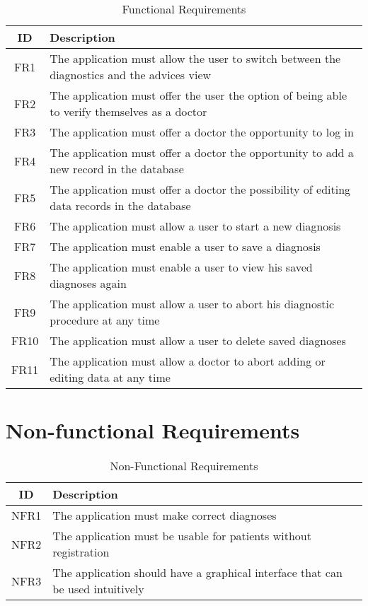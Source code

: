 \begin{table}[H]
	\begin{center}
		\scriptsize
		\def\arraystretch{1.5}%
		\begin{tabular}{ c|l}
			\hline
			\textbf{ID} & \textbf{Description}  \\
			\hline
			FR1 & The application must allow the user to switch between the diagnostics and the advices view  \\
			\hline
			FR2 & The application must offer the user the option of being able to verify themselves as a doctor  \\
			\hline
			FR3 & The application must offer a doctor the opportunity to log in  \\
			\hline
			FR4 & The application must offer a doctor the opportunity to add a new record in the database  \\
			\hline
			FR5 & The application must offer a doctor the possibility of editing data records in the database  \\
			\hline
			FR6 & The application must allow a user to start a new diagnosis  \\
			\hline
			FR7 & The application must enable a user to save a diagnosis  \\
			\hline	
			FR8 & The application must enable a user to view his saved diagnoses again  \\
			\hline
			FR9& The application must allow a user to abort his diagnostic procedure at any time \\
			\hline
			FR10 & The application must allow a user to delete saved diagnoses  \\
			\hline
			FR11 & The application must allow a doctor to abort adding or editing data at any time\\
			\hline
		\end{tabular}
		\normalsize
	\end{center}
	\caption{Functional Requirements}
\end{table}

\tocless\section{Non-functional Requirements}
\begin{table}[H]
	\begin{center}
		\scriptsize
		\def\arraystretch{1.5}%
		\begin{tabular}{ c|l }
			\hline
			\textbf{ID} & \textbf{Description}  \\
			\hline
			NFR1 & The application must make correct diagnoses  \\
			\hline
			NFR2 & The application must be usable for patients without registration  \\
			\hline
			NFR3 & The application should have a graphical interface that can be used intuitively  \\
			\hline	
		\end{tabular}
		\normalsize
	\end{center}
	\caption{Non-Functional Requirements}
\end{table}
\pagebreak



